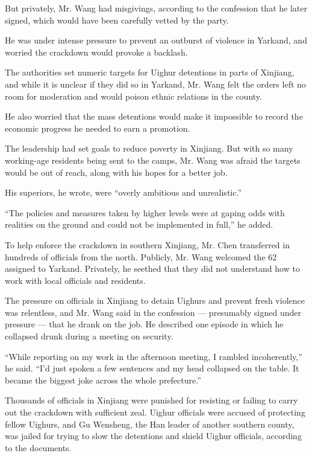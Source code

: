 But privately, Mr. Wang had misgivings, according to the confession that
he later signed, which would have been carefully vetted by the party.

He was under intense pressure to prevent an outburst of violence in
Yarkand, and worried the crackdown would provoke a backlash.

The authorities set numeric targets for Uighur detentions in parts of
Xinjiang, and while it is unclear if they did so in Yarkand, Mr. Wang
felt the orders left no room for moderation and would poison ethnic
relations in the county.

He also worried that the mass detentions would make it impossible to
record the economic progress he needed to earn a promotion.

The leadership had set goals to reduce poverty in Xinjiang. But with so
many working-age residents being sent to the camps, Mr. Wang was afraid
the targets would be out of reach, along with his hopes for a better
job.

His superiors, he wrote, were ``overly ambitious and unrealistic.''

``The policies and measures taken by higher levels were at gaping odds
with realities on the ground and could not be implemented in full,'' he
added.

To help enforce the crackdown in southern Xinjiang, Mr. Chen transferred
in hundreds of officials from the north. Publicly, Mr. Wang welcomed the
62 assigned to Yarkand. Privately, he seethed that they did not
understand how to work with local officials and residents.

The pressure on officials in Xinjiang to detain Uighurs and prevent
fresh violence was relentless, and Mr. Wang said in the confession ---
presumably signed under pressure --- that he drank on the job. He
described one episode in which he collapsed drunk during a meeting on
security.

``While reporting on my work in the afternoon meeting, I rambled
incoherently,'' he said. ``I'd just spoken a few sentences and my head
collapsed on the table. It became the biggest joke across the whole
prefecture.''

Thousands of officials in Xinjiang were punished for resisting or
failing to carry out the crackdown with sufficient zeal. Uighur
officials were accused of protecting fellow Uighurs, and Gu Wensheng,
the Han leader of another southern county, was jailed for trying to slow
the detentions and shield Uighur officials, according to the documents.

